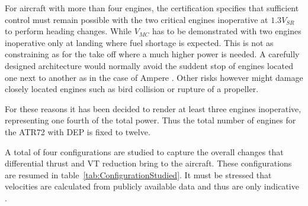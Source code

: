 For aircraft with more than four engines, the certification specifies that sufficient control must remain possible with the two critical engines inoperative at $1.3V_{SR}$ to perform heading changes. While $V_{MC}$ has to be demonstrated with two engines inoperative only at landing where fuel shortage is expected. This is not as constraining as for the take off where a much higher power is needed. A carefully designed architecture would normally avoid the suddent stop of engines located one next to another as in the case of Ampere \cite{Ampere_concept}. Other risks however might damage closely located engines such as bird collision or rupture of a propeller.

For these reasons it has been decided to render at least three engines inoperative, representing one fourth of the total power. Thus the total number of engines for the ATR72 with DEP is fixed to twelve.

A total of four configurations are studied to capture the overall changes that differential thrust and VT reduction bring to the aircraft. These configurations are resumed in table~\ref{tab:ConfigurationStudied}. It must be stressed that velocities are calculated from publicly available data and thus are only indicative \cite{ATRspeed}.


